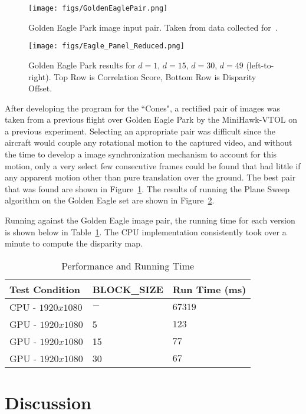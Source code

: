 \documentclass[runningheads]{llncs}
\begin{document}
\begin{figure}
\texttt{[image: figs/GoldenEaglePair.png]}
\caption{Golden Eagle Park image input pair. Taken from data collected for~\cite{arora2022deep}.} \label{fig-GoldenEagleInput}
\end{figure}


\begin{figure}
\texttt{[image: figs/Eagle\_Panel\_Reduced.png]}
\caption{Golden Eagle Park results for $d=1$, $d=15$, $d=30$, $d=49$ (left-to-right). Top Row is Correlation Score, Bottom Row is Disparity Offset.} \label{fig-GoldenEagleResults}
\end{figure}

After developing the program for the ``Cones", a rectified pair of images was taken from a previous flight over Golden Eagle Park by the MiniHawk-VTOL on a previous experiment. Selecting an appropriate pair was difficult since the aircraft would couple any rotational motion to the captured video, and without the time to develop a image synchronization mechanism to account for this motion, only a very select few consecutive frames could be found that had little if any apparent motion other than pure translation over the ground. The best pair that was found are shown in Figure~\ref{fig-GoldenEagleInput}. The results of running the Plane Sweep algorithm on the Golden Eagle set are shown in Figure~\ref{fig-GoldenEagleResults}.


Running against the Golden Eagle image pair, the running time for each version is shown below in Table~\ref{tab1}. The CPU implementation consistently took over a minute to compute the disparity map.

\begin{table}
\caption{Performance and Running Time}\label{tab1}
\begin{tabular}{|l|l|l|}
\hline
Test Condition &  BLOCK\_SIZE & Run Time (ms)\\
\hline
CPU - $1920 x 1080$ & $-$ & $67319$\\
GPU - $1920 x 1080$ &  5  & $123$\\
GPU - $1920 x 1080$ & 15  & $77$\\
GPU - $1920 x 1080$ & 30  & $67$\\
\hline
\end{tabular}
\end{table}


\section{Discussion}
\end{document}
